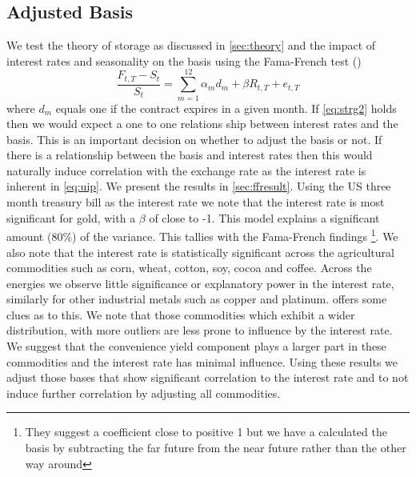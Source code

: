 \subsection{Adjusted Basis}
We test the theory of storage as discussed in \autoref{sec:theory} and the impact of interest rates and seasonality on the basis using the Fama-French test (\cite{famafrench})
\begin{equation}
\label{eq:ff}
 \frac{F_{t,T} - S_t}{S_t} = \sum_{m=1}^{12} \alpha_m d_m + \beta R_{t,T} + e_{t, T}
\end{equation}
where $d_m$ equals one if the contract expires in a given month. If \autoref{eq:strg2} holds then we would expect a one to one relations ship between interest rates and the basis. This is an important decision on whether to adjust the basis or not. If there is a relationship between the basis and interest rates then this would naturally induce correlation with the exchange rate as the interest rate is inherent in \autoref{eq:uip}. We present the results in \autoref{sec:ffresult}. Using the US three month treasury bill as the interest rate we note that the interest rate is most significant for gold, with a $\beta$ of close to -1. This model explains a significant amount ($80\%$) of the variance. This tallies with the Fama-French findings \cite{famafrench}\footnote{They suggest a coefficient close to positive 1 but we have a calculated the basis by subtracting the far future from the near future rather than the other way around}. We also note that the interest rate is statistically significant across the agricultural commodities such as corn, wheat, cotton, soy, cocoa and coffee. Across the energies we observe little significance or explanatory power in the interest rate, similarly for other industrial metals such as copper and platinum.  offers some clues as to this. We note that those commodities which exhibit a wider distribution, with more outliers are less prone to influence by the interest rate. We suggest that the convenience yield component plays a larger part in these commodities and the interest rate has minimal influence. Using these results we adjust those bases that show significant correlation to the interest rate and to not induce further correlation by adjusting all commodities.



